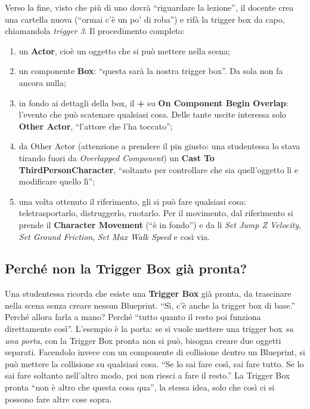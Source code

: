 Verso la fine, visto che più di uno dovrà ``riguardare la lezione'', il
docente crea una cartella nuova (``ormai c'è un po' di roba'') e rifà la
trigger box da capo, chiamandola \emph{trigger 3}. Il procedimento completo:
\begin{enumerate}
  \item un \textbf{Actor}, cioè un oggetto che si può mettere nella scena;
  \item un componente \textbf{Box}: ``questa sarà la nostra trigger box''.
        Da sola non fa ancora nulla;
  \item in fondo ai dettagli della box, il \textbf{+} su \textbf{On
        Component Begin Overlap}: l'evento che può scatenare qualsiasi cosa.
        Delle tante uscite interessa solo \textbf{Other Actor}, ``l'attore
        che l'ha toccato'';
  \item da Other Actor (attenzione a prendere il pin giusto: una studentessa
        lo stava tirando fuori da \emph{Overlapped Component}) un \textbf{Cast
        To ThirdPersonCharacter}, ``soltanto per controllare che sia
        quell'oggetto lì e modificare quello lì'';
  \item una volta ottenuto il riferimento, gli si può fare qualsiasi cosa:
        teletrasportarlo, distruggerlo, ruotarlo. Per il movimento, dal
        riferimento si prende il \textbf{Character Movement} (``è in fondo'')
        e da lì \emph{Set Jump Z Velocity}, \emph{Set Ground Friction},
        \emph{Set Max Walk Speed} e così via.
\end{enumerate}

\subsection{Perché non la Trigger Box già pronta?}

Una studentessa ricorda che esiste una \textbf{Trigger Box} già pronta, da
trascinare nella scena senza creare nessun Blueprint. ``Sì, c'è anche la
trigger box di base.'' Perché allora farla a mano? Perché ``tutto quanto il
resto poi funziona direttamente così''. L'esempio è la porta: se si vuole
mettere una trigger box \emph{su una porta}, con la Trigger Box pronta non si
può, bisogna creare due oggetti separati. Facendolo invece con un componente
di collisione dentro un Blueprint, si può mettere la collisione su qualsiasi
cosa. ``Se lo sai fare così, sai fare tutto. Se lo sai fare soltanto
nell'altro modo, poi non riesci a fare il resto.'' La Trigger Box pronta ``non
è altro che questa cosa qua'', la stessa idea, solo che così ci si possono
fare altre cose sopra.

